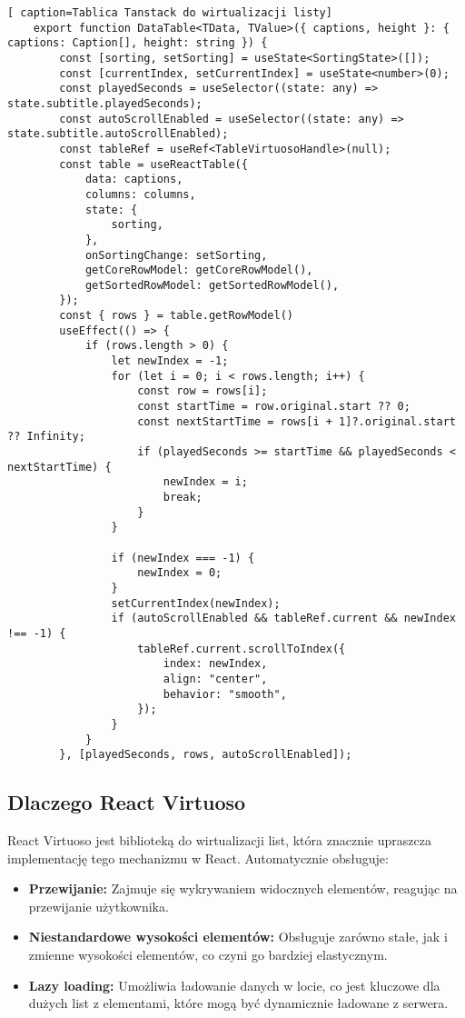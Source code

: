\begin{lstlisting}[ caption=Tablica Tanstack do wirtualizacji listy]
    export function DataTable<TData, TValue>({ captions, height }: { captions: Caption[], height: string }) {
        const [sorting, setSorting] = useState<SortingState>([]);
        const [currentIndex, setCurrentIndex] = useState<number>(0);
        const playedSeconds = useSelector((state: any) => state.subtitle.playedSeconds);
        const autoScrollEnabled = useSelector((state: any) => state.subtitle.autoScrollEnabled);
        const tableRef = useRef<TableVirtuosoHandle>(null);
        const table = useReactTable({
            data: captions,
            columns: columns,
            state: {
                sorting,
            },
            onSortingChange: setSorting,
            getCoreRowModel: getCoreRowModel(),
            getSortedRowModel: getSortedRowModel(),
        });
        const { rows } = table.getRowModel()
        useEffect(() => {
            if (rows.length > 0) {
                let newIndex = -1;
                for (let i = 0; i < rows.length; i++) {
                    const row = rows[i];
                    const startTime = row.original.start ?? 0;
                    const nextStartTime = rows[i + 1]?.original.start ?? Infinity;
                    if (playedSeconds >= startTime && playedSeconds < nextStartTime) {
                        newIndex = i;
                        break;
                    }
                }

                if (newIndex === -1) {
                    newIndex = 0;
                }
                setCurrentIndex(newIndex);
                if (autoScrollEnabled && tableRef.current && newIndex !== -1) {
                    tableRef.current.scrollToIndex({
                        index: newIndex,
                        align: "center",
                        behavior: "smooth",
                    });
                }
            }
        }, [playedSeconds, rows, autoScrollEnabled]);
\end{lstlisting}

\subsection*{Dlaczego React Virtuoso}
React Virtuoso jest biblioteką do wirtualizacji list, która znacznie upraszcza implementację tego mechanizmu w React. Automatycznie obsługuje:
\begin{itemize}
    \item \textbf{Przewijanie:} Zajmuje się wykrywaniem widocznych elementów, reagując na przewijanie użytkownika.
    \item \textbf{Niestandardowe wysokości elementów:} Obsługuje zarówno stałe, jak i zmienne wysokości elementów, co czyni go bardziej elastycznym.
    \item \textbf{Lazy loading:} Umożliwia ładowanie danych w locie, co jest kluczowe dla dużych list z elementami, które mogą być dynamicznie ładowane z serwera.
\end{itemize}


